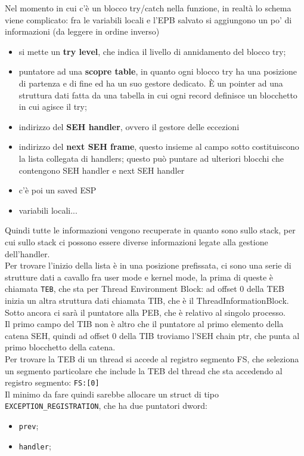 \documentclass[12pt, oneside]{extbook}
\begin{document}
Nel momento in cui c'è un blocco try/catch nella funzione, in realtà lo schema viene complicato: fra le variabili locali e l'EPB salvato si aggiungono un po' di informazioni (da leggere in ordine inverso)
\begin{itemize}
\item si mette un \textbf{try level}, che indica il livello di annidamento del blocco try;
\item puntatore ad una \textbf{scopre table}, in quanto ogni blocco try ha una posizione di partenza e di fine ed ha un suo gestore dedicato. È un pointer ad una struttura dati fatta da una tabella in cui ogni record definisce un blocchetto in cui agisce il try;
\item indirizzo del \textbf{SEH handler}, ovvero il gestore delle eccezioni
\item indirizzo del \textbf{next SEH frame}, questo insieme al campo sotto costituiscono la lista collegata di handlers; questo può puntare ad ulteriori blocchi che contengono SEH handler e next SEH handler
\item c'è  poi un saved ESP
\item variabili locali...
\end{itemize}
Quindi tutte le informazioni vengono recuperate in quanto sono sullo stack, per cui sullo stack ci possono essere diverse informazioni legate alla gestione dell'handler.\\Per trovare l'inizio della lista è in una posizione prefissata, ci sono una serie di strutture dati a cavallo fra user mode e kernel mode, la prima di queste è chiamata \texttt{TEB}, che sta per Thread Environment Block: ad offset 0 della TEB inizia un altra struttura dati chiamata TIB, che è il ThreadInformationBlock. Sotto ancora ci sarà il puntatore alla PEB, che è relativo al singolo processo.\\Il primo campo del TIB non è altro che il puntatore al primo elemento della catena SEH, quindi ad offset 0 della TIB troviamo l'SEH chain ptr, che punta al primo blocchetto della catena.\\Per trovare la TEB di un thread si accede al registro segmento FS, che seleziona un segmento particolare che include la TEB del thread che sta accedendo al registro segmento: \texttt{FS:[0]}\\Il minimo da fare quindi sarebbe allocare un struct di tipo \texttt{EXCEPTION\_REGISTRATION}, che ha due puntatori dword:
\begin{itemize}
\item \texttt{prev};
\item \texttt{handler};
\end{itemize}
\end{document}
